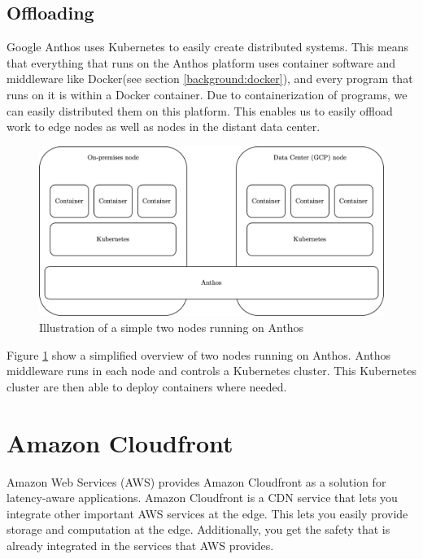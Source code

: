 \subsection{Offloading}
Google Anthos uses Kubernetes\cite{noauthor_production-grade_nodate} to easily create distributed systems\cite{noauthor_anthos_nodate}. This means that everything that runs on the Anthos platform uses container software and middleware like Docker(see section \ref{background:docker}), and every program that runs on it is within a Docker container. Due to containerization of programs, we can easily distributed them on this platform. This enables us to easily offload work to edge nodes as well as nodes in the distant data center.
\begin{figure}[t]
    \centering
    \includegraphics[scale=0.9]{chapters/4_architectures/figures/anthos_architecture.png}
    \caption{Illustration of a simple two nodes running on Anthos}
    \label{fig:Anthos_architecture}
\end{figure}
Figure \ref{fig:Anthos_architecture} show a simplified overview of two nodes running on Anthos. Anthos middleware runs in each node and controls a Kubernetes cluster. This Kubernetes cluster are then able to deploy containers where needed.



\section{Amazon Cloudfront}
Amazon Web Services (AWS) provides Amazon Cloudfront as a solution for latency-aware applications\cite{noauthor_production-grade_nodate}. Amazon Cloudfront is a CDN service that lets you integrate other important AWS services at the edge. This lets you easily provide storage and computation at the edge. Additionally, you get the safety that is already integrated in the services that AWS provides. 

